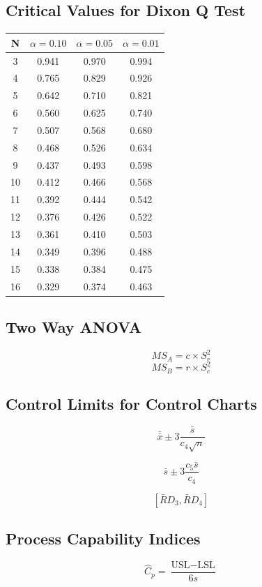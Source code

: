 \documentclass[a4paper,12pt]{article}
\begin{document}
\subsection*{Critical Values for Dixon Q Test}
{
	\Large
	\begin{center}
		\begin{tabular}{|c|c|c|c|}
			\hline  N  & $\alpha=0.10$  & $\alpha=0.05$  & $\alpha=0.01$  \\ \hline
			3  & 0.941 & 0.970 & 0.994 \\ \hline
			4  & 0.765 & 0.829 & 0.926 \\ \hline
			5  & 0.642 & 0.710  & 0.821 \\ \hline
			6  & 0.560 & 0.625 & 0.740 \\ \hline
			7  & 0.507 & 0.568 & 0.680  \\ \hline
			8  & 0.468 & 0.526 & 0.634 \\ \hline
			9  & 0.437 & 0.493 & 0.598 \\ \hline
			10 & 0.412 & 0.466 & 0.568 \\ \hline
			11 & 0.392 & 0.444 & 0.542 \\ \hline
			12 & 0.376 & 0.426 & 0.522 \\ \hline
			13 & 0.361 & 0.410 & 0.503 \\ \hline
			14 & 0.349 & 0.396 & 0.488 \\ \hline
			15 & 0.338 & 0.384 & 0.475 \\ \hline
			16 & 0.329 & 0.374 & 0.463 \\ \hline
		\end{tabular} 
	\end{center}
}
\subsection*{Two Way ANOVA}
\[MS_A = c \times S^2_r\]
\[MS_B = r \times S^2_c\]

\subsection*{Control Limits for Control Charts}

\[ \bar{\bar{x}} \pm 3\frac{\bar{s}}{c_4\sqrt{n}}\]

\[ \bar{s} \pm 3\frac{c_5\bar{s}}{c_4}\]

\[\left[ \bar{R}D_3, \bar{R}D_4\right]\]

\subsection*{Process Capability Indices}
\[ \hat{C}_p = \frac{\mbox{USL} - \mbox{LSL}}{6s}\]
\end{document}
